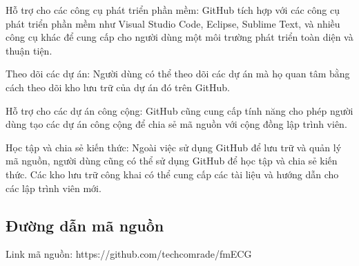 \begin{enumerate}[a)]
Hỗ trợ cho các công cụ phát triển phần mềm: GitHub tích hợp với các công cụ phát triển phần mềm như Visual Studio Code, Eclipse, Sublime Text, và nhiều công cụ khác để cung cấp cho người dùng một môi trường phát triển toàn diện và thuận tiện.


Theo dõi các dự án: Người dùng có thể theo dõi các dự án mà họ quan tâm bằng cách theo dõi kho lưu trữ của dự án đó trên GitHub.


Hỗ trợ cho các dự án công cộng: GitHub cũng cung cấp tính năng cho phép người dùng tạo các dự án công cộng để chia sẻ mã nguồn với cộng đồng lập trình viên.


Học tập và chia sẻ kiến thức: Ngoài việc sử dụng GitHub để lưu trữ và quản lý mã nguồn, người dùng cũng có thể sử dụng GitHub để học tập và chia sẻ kiến thức. Các kho lưu trữ công khai có thể cung cấp các tài liệu và hướng dẫn cho các lập trình viên mới.

  
\end{enumerate}

\subsection*{Đường dẫn mã nguồn}

Link mã nguồn: https://github.com/techcomrade/fmECG

\clearpage
